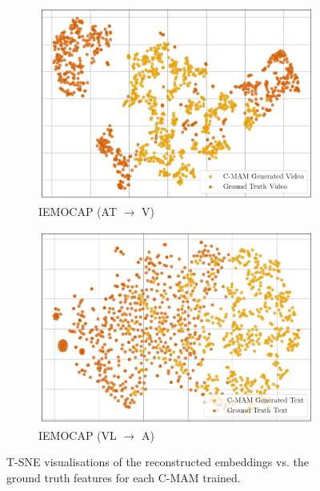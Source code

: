 \begin{figure}[!p]
\begin{subfigure}[b]{0.24\textwidth}
        \includegraphics[width=\textwidth]{imgs/tsne/mmin/iemocap/cmam_gen_video_with_at.png}
        \caption*{IEMOCAP (AT $\rightarrow$ V)}
    \end{subfigure}
    \begin{subfigure}[b]{0.24\textwidth}
        \centering
        \includegraphics[width=\textwidth]{imgs/tsne/mmin/iemocap/cmam_gen_text_with_av.png}
        \caption*{IEMOCAP (VL $\rightarrow$ A)}
    \end{subfigure}
    \caption{T-SNE visualisations of the reconstructed embeddings vs. the ground truth features for each C-MAM trained.}
    \label{fig:tsne}

\end{figure}

